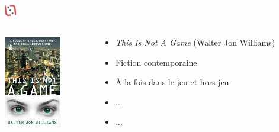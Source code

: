 \documentclass[slidetop,11pt]{beamer}
\def\moreInFrameTitleLeftt{\includegraphics[height=0.5cm]{img/ligueludique-0.png}~~~~~}
\begin{document}
\subsubsection{\sectionPartIIaVI}
\begin{frame}
	\frametitle{\moreInFrameTitleLeftt \sectionPartIIaVI }
	\begin{columns}[T]
		\begin{column}[T]{4.1cm}
			\includegraphics[height=4.05cm]{img/thisIsNotAGameWJW.jpg}
		\end{column}
		\begin{column}[T]{7cm}
			 \begin{beamerboxesrounded}	[lower=substructureRED, %
							 upper=block title RED,%
							 shadow=true]%
				   {\sectionPartIIaVI}
				\begin{itemize}
					\item \emph{This Is Not A Game} (Walter Jon Williams)
					\item Fiction contemporaine
					\item {\`A} la fois dans le jeu et hors jeu
					\item ...
					\item ...
				\end{itemize}
			\end{beamerboxesrounded}
		\end{column}
	\end{columns}
\end{frame} 

\def\sectionPartIIaVII{The Web Soap}
\end{document}
